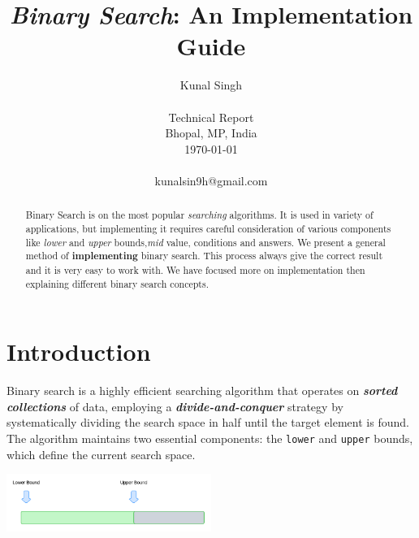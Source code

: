 \documentclass[10pt,twocolumn]{article}
\begin{document}
	
	\title{\emph{Binary Search}: An Implementation Guide}
	
	\author{Kunal Singh   \\
		\\
		Technical Report \\
		Bhopal, MP, India \\
		\today
		\\
		\\
		kunalsin9h@gmail.com  \\
	}
	
	\maketitle
	\thispagestyle{empty}
	
	\begin{abstract}
		Binary Search is on the most popular \emph{searching} algorithms. It is used in variety of applications, but implementing it requires careful consideration of various components like \emph{lower} and \emph{upper} bounds,\emph{mid} value, conditions and answers. We present a general method of \textbf{implementing} binary search. This process always give the correct result and it is very easy to work with. We have focused more on implementation then explaining different binary search concepts. 
	\end{abstract}
	
	
	\section{Introduction}
		
		Binary search is a highly efficient searching algorithm that operates on \textit{\textbf{sorted collections}} of data, employing a \textit{\textbf{divide-and-conquer}} strategy by systematically dividing the search space in half until the target element is found. The algorithm maintains two essential components: the \texttt{lower} and \texttt{upper} bounds, which define the current search space. 
		
		\begin{center}
			\includegraphics[width=0.5\textwidth]{bounds.png}
		\end{center}
		
\end{document}
